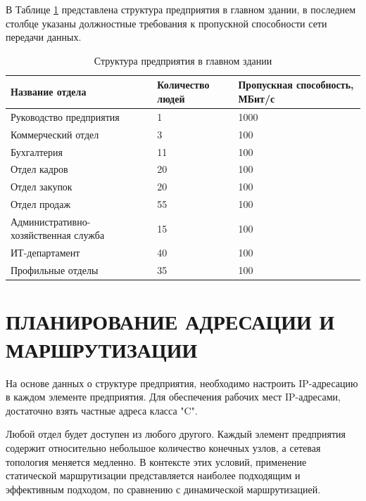 \documentclass[14pt, a4paper]{extarticle}
\begin{document}
В Таблице \ref{table:1:mainDepStructure} представлена структура предприятия в главном здании, 
в последнем столбце указаны должностные требования к пропускной
способности сети передачи данных.
\begin{table}[H]
\centering
\small
\caption{Структура предприятия в главном здании}
\begin{tabular}{|m{5cm}|m{3cm}|m{3cm}|}
\hline
\textbf{Название отдела} & \textbf{Количество людей} & \textbf{Пропускная способность, МБит/с} \\
\hline
Руководство предприятия & 1 & 1000 \\
\hline
Коммерческий отдел & 3 & 100 \\
\hline
Бухгалтерия & 11 & 100 \\
\hline
Отдел кадров & 20 & 100 \\
\hline
Отдел закупок & 20 & 100 \\
\hline
Отдел продаж & 55 & 100 \\
\hline
Административно-хозяйственная служба & 15 & 100 \\
\hline
ИТ-департамент & 40 & 100 \\
\hline
Профильные отделы & 35 & 100 \\
\hline
\end{tabular}
\label{table:1:mainDepStructure}
\end{table}



\section[ПЛАНИРОВАНИЕ АДРЕСАЦИИ И МАРШРУТИЗАЦИИ]{ПЛАНИРОВАНИЕ АДРЕСАЦИИ И \\ МАРШРУТИЗАЦИИ}
На основе данных о структуре предприятия,
необходимо настроить IP-адресацию в каждом элементе
предприятия. Для обеспечения рабочих мест IP-адресами, достаточно взять частные адреса класса "C".


Любой отдел будет доступен из любого другого.
Каждый элемент предприятия содержит относительно небольшое количество конечных узлов, 
а сетевая топология меняется медленно. В контексте этих условий, применение 
статической маршрутизации представляется наиболее подходящим и эффективным подходом, 
по сравнению с динамической маршрутизацией.\cite{habr-routing}
\end{document}
